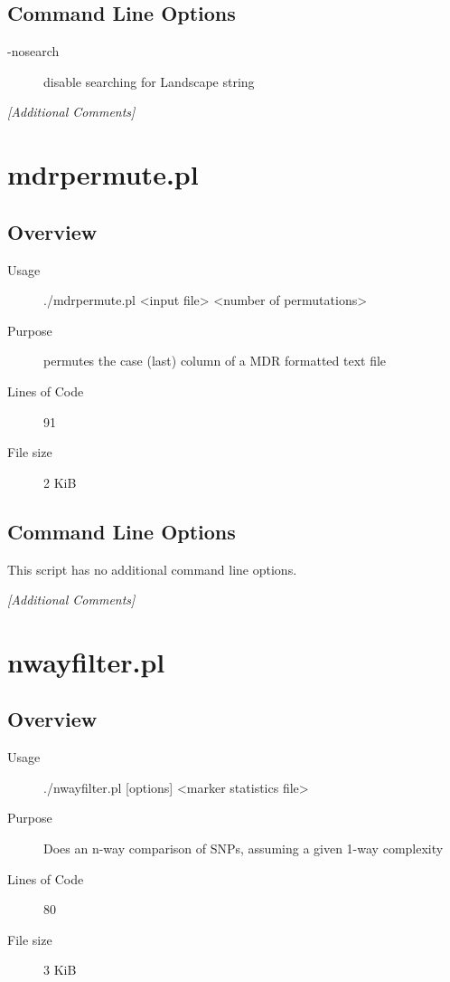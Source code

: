 \subsection{Command Line Options}
\label{sec:mdr2markerstats.pl-command-line}

\begin{description}
\item[-nosearch] disable searching for Landscape string
\end{description}

\emph{[Additional Comments]}

\section{mdrpermute.pl}
\label{sec:mdrpermute.pl}

\subsection{Overview}
\label{sec:mdrpermute.pl-overview}

\begin{description}
\item[Usage] ./mdrpermute.pl <input file> <number of permutations>
\item[Purpose] permutes the case (last) column of a MDR formatted text file
\item[Lines of Code] 91
\item[File size] 2 KiB
\end{description}

\subsection{Command Line Options}
\label{sec:mdrpermute.pl-command-line}

This script has no additional command line options.

\emph{[Additional Comments]}

\section{nwayfilter.pl}
\label{sec:nwayfilter.pl}

\subsection{Overview}
\label{sec:nwayfilter.pl-overview}

\begin{description}
\item[Usage] ./nwayfilter.pl [options] <marker statistics file>
\item[Purpose] Does an n-way comparison of SNPs, assuming a given 1-way complexity
\item[Lines of Code] 80
\item[File size] 3 KiB
\end{description}

